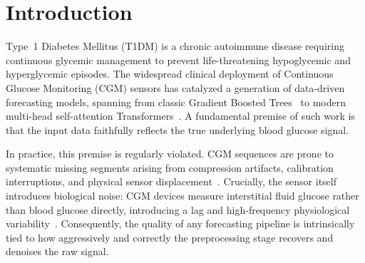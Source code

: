 \documentclass[pmlr,twocolumn,10pt]{jmlr} %
\newif\ifmlhneedsstatements
\begin{document}
\ifmlhneedsstatements
\paragraph*{Data and Code Availability}
This study utilizes two publicly available datasets: the HUPA-UCM dataset \citep{rojas2019hupa} and the OhioT1DM dataset \citep{marling2020ohiot1dm}. As this research relies entirely on previously published, de-identified public datasets, it is exempt from new Institutional Review Board (IRB) ethical approval. 

To ensure full reproducibility of the preprocessing pipelines and model architectures evaluated in this study, the complete source code will be made open-source and publicly available upon acceptance of this manuscript.

\paragraph*{Institutional Review Board (IRB)}
This research uses publicly available, de-identified datasets and has been designated as Not Human Subject Research, thus exempt from IRB approval.
\fi

\section{Introduction}

Type~1 Diabetes Mellitus (T1DM) is a chronic autoimmune disease requiring continuous glycemic management to prevent life-threatening hypoglycemic and hyperglycemic episodes. The widespread clinical deployment of Continuous Glucose Monitoring (CGM) sensors has catalyzed a generation of data-driven forecasting models, spanning from classic Gradient Boosted Trees~\citep{chen2016xgboost} to modern multi-head self-attention Transformers~\citep{vaswani2017attention}. A fundamental premise of such work is that the input data faithfully reflects the true underlying blood glucose signal.

In practice, this premise is regularly violated. CGM sequences are prone to systematic missing segments arising from compression artifacts, calibration interruptions, and physical sensor displacement~\citep{marling2020ohiot1dm}. Crucially, the sensor itself introduces biological noise: CGM devices measure interstitial fluid glucose rather than blood glucose directly, introducing a lag and high-frequency physiological variability~\citep{facchinetti2015kalman}. Consequently, the quality of any forecasting pipeline is intrinsically tied to how aggressively and correctly the preprocessing stage recovers and denoises the raw signal.
\end{document}
